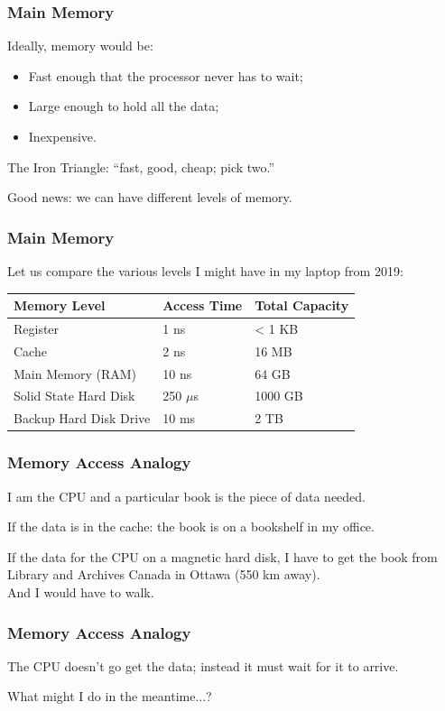 \begin{frame}
\frametitle{Main Memory}
Ideally, memory would be:

\begin{itemize}
	\item Fast enough that the processor never has to wait;
	\item Large enough to hold all the data;
	\item Inexpensive.
\end{itemize}

The \alert{Iron Triangle}: ``fast, good, cheap; pick two.''

Good news: we can have different levels of memory.

\end{frame}

\begin{frame}
\frametitle{Main Memory}

Let us compare the various levels I might have in my laptop from 2019:

\begin{center}
	\begin{tabular}{l|l|l}
	\textbf{Memory Level} & \textbf{Access Time} & \textbf{Total Capacity} \\ \hline
	Register & 1 ns & < 1 KB \\
	Cache & 2 ns & 16 MB \\
	Main Memory (RAM) & 10 ns & 64 GB \\
	Solid State Hard Disk & 250 $\mu$s & 1000 GB \\
	Backup Hard Disk Drive & 10 ms & 2 TB \\
	\end{tabular}
\end{center}


\end{frame}

\begin{frame}
\frametitle{Memory Access Analogy}
I am the CPU and a particular book is the piece of data needed.

If the data is in the cache: the book is on a bookshelf in my office.

If the data for the CPU on a magnetic hard disk, I have to get the book from Library and Archives Canada in Ottawa (550 km away).\\
\quad And I would have to walk.

\end{frame}

\begin{frame}
\frametitle{Memory Access Analogy}

The CPU doesn't go get the data; instead it must wait for it to arrive.

What might I do in the meantime...?

\end{frame}


